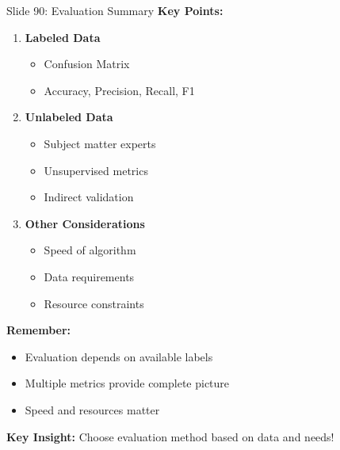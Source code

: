 \documentclass[8pt]{beamer}
\begin{document}
	\begin{frame}{Slide 90: Evaluation Summary}
		\fontsize{6.5}{7.5}\selectfont
		\textbf{Key Points:}
		\begin{enumerate}
			\item \textbf{Labeled Data}
			\begin{itemize}
				\item Confusion Matrix
				\item Accuracy, Precision, Recall, F1
			\end{itemize}
			\item \textbf{Unlabeled Data}
			\begin{itemize}
				\item Subject matter experts
				\item Unsupervised metrics
				\item Indirect validation
			\end{itemize}
			\item \textbf{Other Considerations}
			\begin{itemize}
				\item Speed of algorithm
				\item Data requirements
				\item Resource constraints
			\end{itemize}
		\end{enumerate}
		
		\vspace{0.1cm}
		\textbf{Remember:}
		\begin{itemize}
			\item Evaluation depends on available labels
			\item Multiple metrics provide complete picture
			\item Speed and resources matter
		\end{itemize}
		
		\textcolor{myblue}{\textbf{Key Insight:}} Choose evaluation method based on data and needs!
	\end{frame}
	
\end{document}
